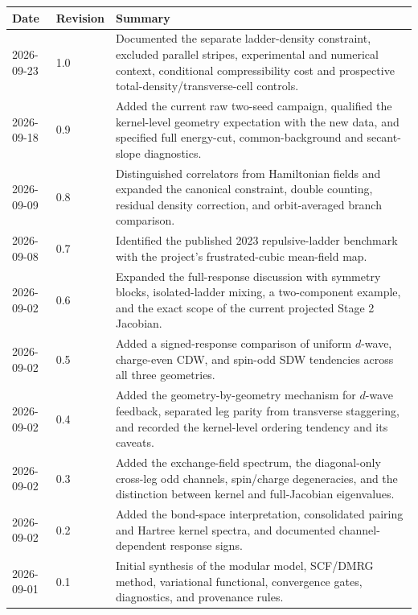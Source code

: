 \documentclass[11pt]{article}
\begin{document}
\begin{tabularx}{\textwidth}{llX}
\toprule
Date & Revision & Summary \\
\midrule
2026-09-23 & 1.0 & Documented the separate ladder-density constraint,
excluded parallel stripes, experimental and numerical context, conditional
compressibility cost and prospective total-density/transverse-cell controls.\\
2026-09-18 & 0.9 & Added the current raw two-seed campaign, qualified the
kernel-level geometry expectation with the new data, and specified full
energy-cut, common-background and secant-slope diagnostics.\\
2026-09-09 & 0.8 & Distinguished correlators from Hamiltonian fields and
expanded the canonical constraint, double counting, residual density
correction, and orbit-averaged branch comparison.\\
2026-09-08 & 0.7 & Identified the published 2023 repulsive-ladder benchmark
with the project's frustrated-cubic mean-field map.\\
2026-09-02 & 0.6 & Expanded the full-response discussion with symmetry blocks,
isolated-ladder mixing, a two-component example, and the exact scope of the
current projected Stage 2 Jacobian.\\
2026-09-02 & 0.5 & Added a signed-response comparison of uniform \(d\)-wave,
charge-even CDW, and spin-odd SDW tendencies across all three geometries.\\
2026-09-02 & 0.4 & Added the geometry-by-geometry mechanism for \(d\)-wave
feedback, separated leg parity from transverse staggering, and recorded the
kernel-level ordering tendency and its caveats.\\
2026-09-02 & 0.3 & Added the exchange-field spectrum, the diagonal-only
cross-leg odd channels, spin/charge degeneracies, and the distinction between
kernel and full-Jacobian eigenvalues.\\
2026-09-02 & 0.2 & Added the bond-space interpretation, consolidated pairing
and Hartree kernel spectra, and documented channel-dependent response signs.\\
2026-09-01 & 0.1 & Initial synthesis of the modular model, SCF/DMRG method,
variational functional, convergence gates, diagnostics, and provenance rules.\\
\bottomrule
\end{tabularx}
\end{document}
